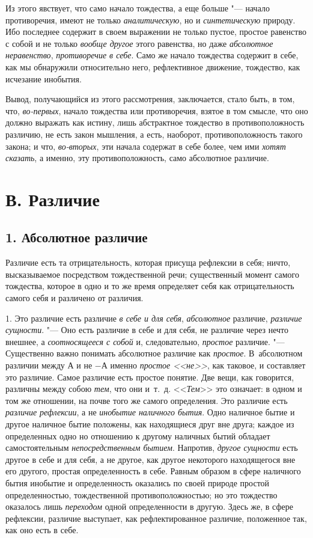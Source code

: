 Из этого явствует, что само начало тождества, а еще больше "--- начало
противоречия, имеют не только {\em аналитическую}, но и
{\em синтетическую} природу. Ибо последнее содержит в
своем выражении не только пустое, простое равенство с собой и не только
{\em вообще другое} этого равенства, но даже
{\em абсолютное неравенство},
{\em противоречие в себе}. Само же начало тождества
содержит в себе, как мы обнаружили относительно него, рефлективное
движение, тождество, как исчезание инобытия.

Вывод, получающийся из этого рассмотрения, заключается, стало быть, в том,
что, {\em во-первых}, начало тождества или
противоречия, взятое в том смысле, что оно должно выражать как истину, лишь
абстрактное тождество в противоположность различию, не есть закон мышления,
а есть, наоборот, противоположность такого закона; и что,
{\em во-вторых}, эти начала содержат в себе более, чем
ими {\em хотят сказать}, а именно, эту
противоположность, само абсолютное различие.

\section[В. Различие]{В. Различие}
\subsection[1. Абсолютное различие]{1. Абсолютное различие}
Различие есть та отрицательность, которая
присуща рефлексии в себя; ничто, высказываемое посредством тождественной
речи; существенный момент самого тождества, которое в одно и то же время
определяет себя как отрицательность самого себя и различено от различия.

1. Это различие есть различие {\em в себе и для себя},
{\em абсолютное} различие,
{\em различие сущности}. "--- Оно есть различие в себе и
для себя, не различие через нечто внешнее, а
{\em соотносящееся с собой} и, следовательно,
{\em простое} различие. "--- Существенно важно понимать
абсолютное различие как {\em простое}. В~абсолютном
различии между $А$ и не $-А$ именно
{\em простое <<не>>}, как таковое, и составляет это
различие. Самое различие есть простое понятие. Две вещи, как говорится,
различны между собою {\em тем}, что они и~т.~д.
<<{\em Тем}>> это означает: в одном и том же отношении,
на почве того же самого определения. Это различие есть
{\em различие рефлексии}, а не
{\em инобытие наличного бытия}. Одно наличное бытие и
другое наличное бытие положены, как находящиеся друг вне друга; каждое из
определенных одно но отношению к другому наличных бытий обладает
самостоятельным {\em непосредственным бытием}.
Напротив, {\em другое сущности} есть другое в себе и
для себя, а не другое, как другое некоторого находящегося вне его другого,
простая определенность в себе. Равным образом в сфере наличного бытия
инобытие и определенность оказались по своей природе простой
определенностью, тождественной противоположностью; но это тождество
оказалось лишь {\em переходом} одной определенности в
другую. Здесь же, в сфере рефлексии, различие выступает, как
рефлектированное различие, положенное так, как оно есть в себе.

